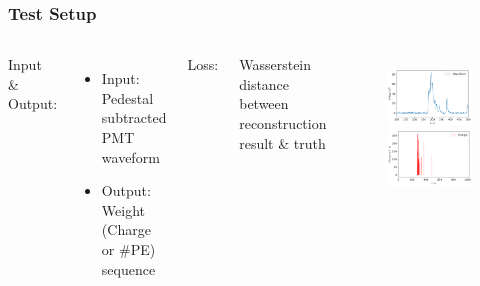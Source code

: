 \documentclass{beamer}
\begin{document}
\begin{frame}
\frametitle{Test Setup}
\begin{columns}
\hspace{4mm}Input \& Output:
\begin{itemize}
    \item Input: Pedestal subtracted PMT waveform
    \item Output: Weight (Charge or \#PE) sequence
\end{itemize}
\hspace{4mm}Loss:

\hspace{4mm}Wasserstein distance \\ \hspace{4mm}between reconstruction \\ \hspace{4mm}result \& truth
\setlength{\abovecaptionskip}{-2mm}
\setlength{\belowcaptionskip}{0mm}
\begin{figure}
    \centering
    \includegraphics[width=0.9\linewidth]{img/wave.png}
    \includegraphics[width=0.9\linewidth]{img/charge.png}
\end{figure}
\end{columns}
\end{frame}
\end{document}
